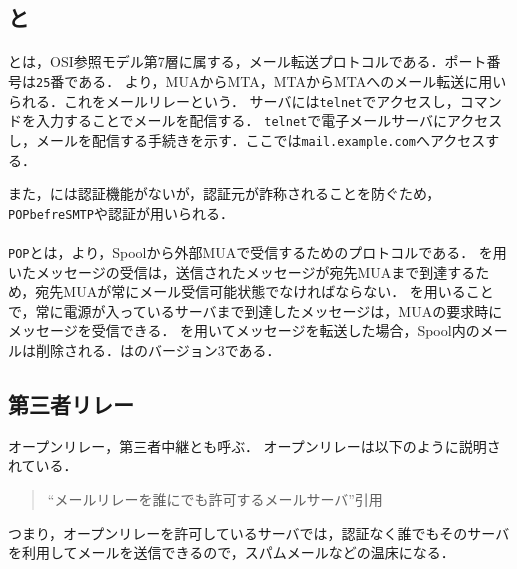 \subsection{\bfseries\smtp と \popt}
\paragraph{\smtp}\smtp とは，OSI参照モデル第7層に属する，メール転送プロトコルである．ポート番号は\texttt{25}番である．
より，MUAからMTA，MTAからMTAへのメール転送に用いられる．これをメールリレーという．
\smtp サーバには\texttt{telnet}でアクセスし，コマンドを入力することでメールを配信する．
\texttt{telnet}で電子メールサーバにアクセスし，メールを配信する手続きを示す．ここでは\texttt{mail.example.com}へアクセスする．

また，\smtp には認証機能がないが，認証元が詐称されることを防ぐため，\texttt{POPbefreSMTP}や\smtp 認証が用いられる\cite[p.173]{インターネット工学}．
\paragraph{\popt}
\texttt{POP}とは，より，Spoolから外部MUAで受信するためのプロトコルである．
\smtp を用いたメッセージの受信は，送信されたメッセージが宛先MUAまで到達するため，宛先MUAが常にメール受信可能状態でなければならない．
\pop を用いることで，常に電源が入っている\pop サーバまで到達したメッセージは，MUAの要求時にメッセージを受信できる．
\pop を用いてメッセージを転送した場合，Spool内のメールは削除される．\popt は\pop のバージョン3である．\hfill\cite[p.200, p.281]{マスタリングTCP/IP}
\subsection{第三者リレー}
オープンリレー，第三者中継とも呼ぶ．
オープンリレーは以下のように説明されている．
\begin{quote}
    ``メールリレーを誰にでも許可するメールサーバ''\hfill 引用\cite[p.53]{Postfix実用ガイド}
\end{quote}
つまり，オープンリレーを許可しているサーバでは，認証なく誰でもそのサーバを利用してメールを送信できるので，スパムメールなどの温床になる\cite[p.53]{Postfix実用ガイド}．